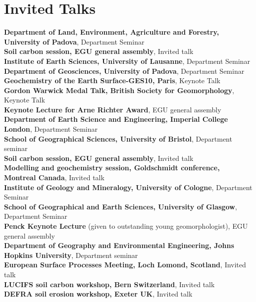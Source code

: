 \documentclass[10pt, a4paper]{article}
\newcommand{\years}[1]{\marginnote{\scriptsize #1}}
\begin{document}
\section*{Invited Talks}
\years{2015}\textbf{Department of Land, Environment, Agriculture and Forestry, University of Padova}, Department Seminar\\[0.05cm]
\years{2014}\textbf{Soil carbon session, EGU general assembly}, Invited talk\\[0.05cm]
\textbf{Institute of Earth Sciences, University of Lausanne}, Department Seminar\\[0.05cm]
\textbf{Department of Geosciences, University of Padova}, Department Seminar\\[0.05cm]
\textbf{Geochemistry of the Earth Surface-GES10, Paris}, Keynote Talk\\[0.05cm]
\textbf{Gordon Warwick Medal Talk, British Society for Geomorphology}, Keynote Talk\\[0.05cm]
\years{2013}\textbf{Keynote Lecture for Arne Richter Award}, EGU general assembly\\[0.05cm]
\textbf{Department of Earth Science and Engineering, Imperial College London},  Department Seminar\\[0.05cm]
\textbf{School of Geographical Sciences, University of Bristol}, Department seminar\\[0.05cm]  
\years{2012}\textbf{Soil carbon session, EGU general assembly}, Invited talk\\[0.05cm]
\textbf{Modelling and geochemistry session, Goldschmidt conference, Montreal Canada}, Invited talk\\[0.05cm]
\textbf{Institute of Geology and Mineralogy, University of Cologne}, Department Seminar\\[0.05cm]
\textbf{School of Geographical and Earth Sciences, University of Glasgow}, Department Seminar\\[0.05cm]
\years{2011}\textbf{Penck Keynote Lecture} (given to outstanding young geomorphologist), EGU general assembly\\[0.05cm]
\textbf{Department of Geography and Environmental Engineering, Johns Hopkins University}, Department seminar\\[0.05cm]
\textbf{European Surface Processes Meeting, Loch Lomond, Scotland}, Invited talk\\[0.05cm]
\textbf{LUCIFS soil carbon workshop, Bern Switzerland}, Invited talk\\[0.05cm]
\textbf{DEFRA soil erosion workshop, Exeter UK}, Invited talk\\[0.05cm]
\end{document}
